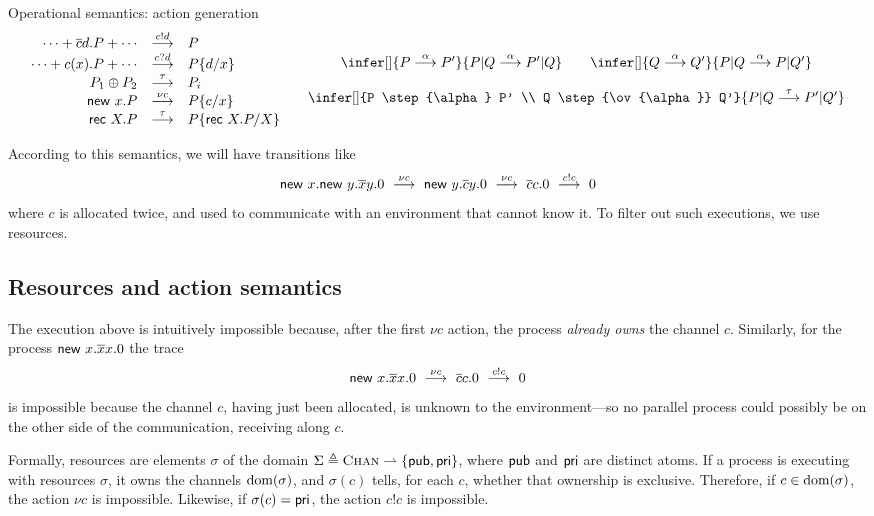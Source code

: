 \documentclass{entcs}
\newcommand{\tr}[1]{}
\begin{document}
\begin{display}{Operational semantics: action generation}
\[
\begin{array}{rcl}
\cdots + \ov{c}d.P + \cdots &\step{c!d}& P \tr{& \sr{ASend}}\\
\cdots + c(x).P +\cdots  &\step{c?d}& P \{d/x\} \tr{& \sr{ARecv}} \\
P_1 \nc P_2 &\step{\tau}& P_i \tr{& \sr{AChooseL/R}} \\ 
\new x.P &\step{\nu c}& P\{c/x\} \tr{& \sr{AAlloc}} \\
\rec X. P &\step{\tau}& 
  P\{\rec X.P/ X\}
  \tr{\multicolumn{2}{l}{P\{\rec X.P/ X\}}\ \sr{ARec}}
\end{array}
\quad
\begin{array}{c}
\infer[\tr{AIntL}]
  {P \step{\alpha} P'}
  {P|Q \step{\alpha} P'|Q}
\qquad
\infer[\tr{AIntR}]
  {Q \step{\alpha} Q'}
  {P|Q \step{\alpha} P|Q'}
\\
\\
\infer[\tr{ACom}]
  {P \step{\alpha} P' \\
   Q \step{\ov{\alpha}} Q'}
  {P|Q \step{\tau} P'|Q'}
\end{array}
\]
\end{display}
According to this semantics, we will have transitions like
\[
  \textsf{new } x. \textsf{new } y. \overline{x}y. 0
\ \stackrel{\nu c}{\longrightarrow}\
  \textsf{new } y. \overline{c}y. 0
\ \stackrel{\nu c}{\longrightarrow}\
  \overline{c}c. 0
\ \stackrel{c!c}{\longrightarrow}\
  0
\]
where $c$ is allocated twice, and used to communicate with an
environment that cannot know it.  To filter out such executions, we
use resources.

\subsection{Resources and action semantics}\label{sec:action-sem}

The execution above is intuitively impossible because, after the first
$\nu c$ action, the process \emph{already owns} the channel $c$.
Similarly, for the process $\textsf{new } x. \overline{x}x . 0$ the trace
\[
\textsf{new } x. \overline{x}x. 0
\ \stackrel{\nu c}{\longrightarrow}\
  \overline{c}c. 0
\ \stackrel{c!c}{\longrightarrow}\
  0
\]
is impossible because the channel $c$, having just been allocated, is
unknown to the environment---so no parallel process could possibly be
on the other side of the communication, receiving along $c$.

Formally, resources are elements $\sigma$ of the domain $ \Sigma
\triangleq \textsc{Chan} \rightharpoonup \{ \textsf{pub}, \textsf{pri} \} $, where $\textsf{pub}$
and $\textsf{pri}$ are distinct atoms.  If a process is executing with
resources $\sigma$, it owns the channels $\textrm{dom}(\sigma)$, and
$\sigma(c)$ tells, for each $c$, whether that ownership is exclusive.
Therefore, if $c \in \textrm{dom}(\sigma)$, the action $\nu c$ is impossible.
Likewise, if $\sigma(c) = \textsf{pri}$, the action $c!c$ is impossible.
\end{document}
